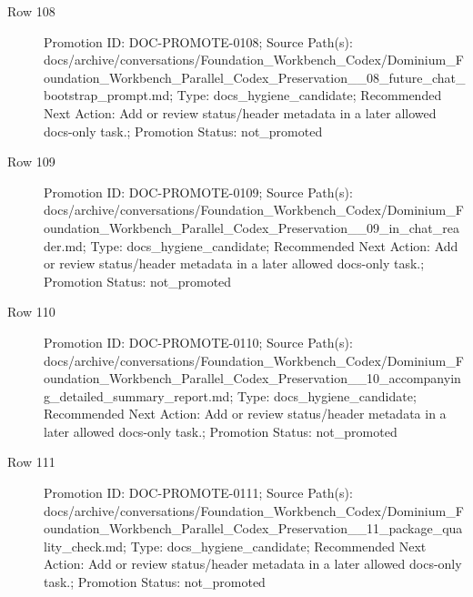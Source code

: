 \documentclass[9pt,a4paper,openany]{book}
\begin{document}
\begin{description}
\item[Row 108] Promotion ID: DOC-\allowbreak{}PROMOTE-\allowbreak{}0108; Source Path(s): docs/\allowbreak{}archive/\allowbreak{}conversations/\allowbreak{}Foundation\_\allowbreak{}Workbench\_\allowbreak{}Codex/\allowbreak{}Dominium\_\allowbreak{}Foundation\_\allowbreak{}Workbench\_\allowbreak{}Parallel\_\allowbreak{}Codex\_\allowbreak{}Preservation\_\allowbreak{}\_\allowbreak{}08\_\allowbreak{}future\_\allowbreak{}chat\_\allowbreak{}bootstrap\_\allowbreak{}prompt.\allowbreak{}md; Type: docs\_\allowbreak{}hygiene\_\allowbreak{}candidate; Recommended Next Action: Add or review status/\allowbreak{}header metadata in a later allowed docs-\allowbreak{}only task.\allowbreak{}; Promotion Status: not\_\allowbreak{}promoted
\item[Row 109] Promotion ID: DOC-\allowbreak{}PROMOTE-\allowbreak{}0109; Source Path(s): docs/\allowbreak{}archive/\allowbreak{}conversations/\allowbreak{}Foundation\_\allowbreak{}Workbench\_\allowbreak{}Codex/\allowbreak{}Dominium\_\allowbreak{}Foundation\_\allowbreak{}Workbench\_\allowbreak{}Parallel\_\allowbreak{}Codex\_\allowbreak{}Preservation\_\allowbreak{}\_\allowbreak{}09\_\allowbreak{}in\_\allowbreak{}chat\_\allowbreak{}reader.\allowbreak{}md; Type: docs\_\allowbreak{}hygiene\_\allowbreak{}candidate; Recommended Next Action: Add or review status/\allowbreak{}header metadata in a later allowed docs-\allowbreak{}only task.\allowbreak{}; Promotion Status: not\_\allowbreak{}promoted
\item[Row 110] Promotion ID: DOC-\allowbreak{}PROMOTE-\allowbreak{}0110; Source Path(s): docs/\allowbreak{}archive/\allowbreak{}conversations/\allowbreak{}Foundation\_\allowbreak{}Workbench\_\allowbreak{}Codex/\allowbreak{}Dominium\_\allowbreak{}Foundation\_\allowbreak{}Workbench\_\allowbreak{}Parallel\_\allowbreak{}Codex\_\allowbreak{}Preservation\_\allowbreak{}\_\allowbreak{}10\_\allowbreak{}accompanying\_\allowbreak{}detailed\_\allowbreak{}summary\_\allowbreak{}report.\allowbreak{}md; Type: docs\_\allowbreak{}hygiene\_\allowbreak{}candidate; Recommended Next Action: Add or review status/\allowbreak{}header metadata in a later allowed docs-\allowbreak{}only task.\allowbreak{}; Promotion Status: not\_\allowbreak{}promoted
\item[Row 111] Promotion ID: DOC-\allowbreak{}PROMOTE-\allowbreak{}0111; Source Path(s): docs/\allowbreak{}archive/\allowbreak{}conversations/\allowbreak{}Foundation\_\allowbreak{}Workbench\_\allowbreak{}Codex/\allowbreak{}Dominium\_\allowbreak{}Foundation\_\allowbreak{}Workbench\_\allowbreak{}Parallel\_\allowbreak{}Codex\_\allowbreak{}Preservation\_\allowbreak{}\_\allowbreak{}11\_\allowbreak{}package\_\allowbreak{}quality\_\allowbreak{}check.\allowbreak{}md; Type: docs\_\allowbreak{}hygiene\_\allowbreak{}candidate; Recommended Next Action: Add or review status/\allowbreak{}header metadata in a later allowed docs-\allowbreak{}only task.\allowbreak{}; Promotion Status: not\_\allowbreak{}promoted

\end{description}
\end{document}
